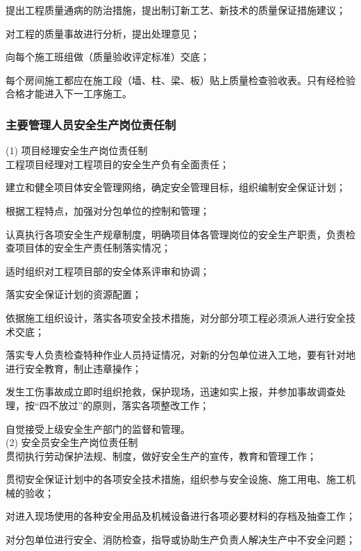  提出工程质量通病的防治措施，提出制订新工艺、新技术的质量保证措施建议；

 对工程的质量事故进行分析，提出处理意见；

 向每个施工班组做（质量验收评定标准）交底；

 每个房间施工都应在施工段（墙、柱、梁、板）贴上质量检查验收表。只有经检验合格才能进入下一工序施工。 \\

\subsubsection{主要管理人员安全生产岗位责任制}

(1) 项目经理安全生产岗位责任制\\

 工程项目经理对工程项目的安全生产负有全面责任；

 建立和健全项目体安全管理网络，确定安全管理目标，组织编制安全保证计划；

 根据工程特点，加强对分包单位的控制和管理；

 认真执行各项安全生产规章制度，明确项目体各管理岗位的安全生产职责，负责检查项目体的安全生产责任制落实情况；

 适时组织对工程项目部的安全体系评审和协调；

 落实安全保证计划的资源配置；

 依据施工组织设计，落实各项安全技术措施，对分部分项工程必须派人进行安全技术交底；

 落实专人负责检查特种作业人员持证情况，对新的分包单位进入工地，要有针对地进行安全教育，制止违章操作；

 发生工伤事故成立即时组织抢救，保护现场，迅速如实上报，并参加事故调查处理，按“四不放过”的原则，落实各项整改工作；

 自觉接受上级安全生产部门的监督和管理。\\

(2) 安全员安全生产岗位责任制\\

 贯彻执行劳动保护法规、制度，做好安全生产的宣传，教育和管理工作；

 贯彻安全保证计划中的各项安全技术措施，组织参与安全设施、施工用电、施工机械的验收；

 对进入现场使用的各种安全用品及机械设备进行各项必要材料的存档及抽查工作；

 对分包单位进行安全、消防检查，指导或协助生产负责人解决生产中不安全问题；

